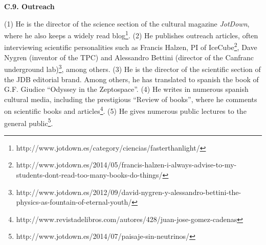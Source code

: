 \documentclass[a4paper,11pt,oneside]{article}
\begin{document}
\vspace{6pt}

\noindent\textbf{C.9. Outreach}

(1) He is the director of the science section of the cultural magazine {\em JotDown}, where he
also keeps a widely read blog\footnote{http://www.jotdown.es/category/ciencias/fasterthanlight/}.
(2) He publishes outreach articles, often interviewing scientific personalities such as Francis Halzen, PI of IceCube\footnote{http://www.jotdown.es/2014/05/francis-halzen-i-always-advise-to-my-students-dont-read-too-many-books-do-things/}, Dave Nygren (inventor of the TPC) and Alessandro Bettini (director of the Canfranc underground lab)\footnote{http://www.jotdown.es/2012/09/david-nygren-y-alessandro-bettini-the-physics-as-fountain-of-eternal-youth/}, among others. (3) He is the director of the scientific section of the JDB editorial brand. Among others, he has translated to spanish the book of G.F. Giudice ``Odyssey in the Zeptospace''. (4) He writes in numerous spanish cultural media, including the prestigious ``Review of books'', where he comments on scientific books and articles\footnote{http://www.revistadelibros.com/autores/428/juan-jose-gomez-cadenas}. (5) He gives numerous public lectures to the general public\footnote{
http://www.jotdown.es/2014/07/paisaje-sin-neutrinos/}.  
\end{document}
